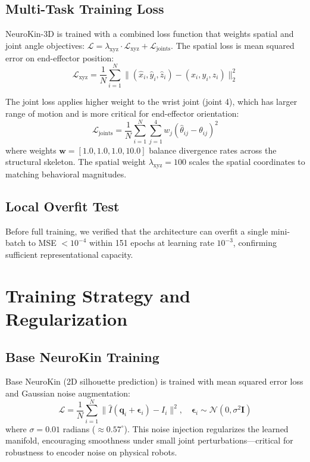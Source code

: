 \documentclass[12pt,a4paper,oneside]{report}
\begin{document}
\subsection{Multi-Task Training Loss}

NeuroKin-3D is trained with a combined loss function that weights spatial and joint angle objectives: $\mathcal{L} = \lambda_{\text{xyz}} \cdot \mathcal{L}_{\text{xyz}} + \mathcal{L}_{\text{joints}}$. The spatial loss is mean squared error on end-effector position:
\begin{equation}
\mathcal{L}_{\text{xyz}} = \frac{1}{N} \sum_{i=1}^{N} \|(\hat{x}_i, \hat{y}_i, \hat{z}_i) - (x_i, y_i, z_i)\|_2^2
\end{equation}

The joint loss applies higher weight to the wrist joint (joint 4), which has larger range of motion and is more critical for end-effector orientation:
\begin{equation}
\mathcal{L}_{\text{joints}} = \frac{1}{N} \sum_{i=1}^{N} \sum_{j=1}^{4} w_j (\hat{\theta}_{ij} - \theta_{ij})^2
\end{equation}
where weights $\mathbf{w} = [1.0, 1.0, 1.0, 10.0]$ balance divergence rates across the structural skeleton. The spatial weight $\lambda_{\text{xyz}} = 100$ scales the spatial coordinates to matching behavioral magnitudes.

\subsection{Local Overfit Test}

Before full training, we verified that the architecture can overfit a single mini-batch to MSE $< 10^{-4}$ within 151 epochs at learning rate $10^{-3}$, confirming sufficient representational capacity.

\section{Training Strategy and Regularization}

\subsection{Base NeuroKin Training}

Base NeuroKin (2D silhouette prediction) is trained with mean squared error loss and Gaussian noise augmentation:
\begin{equation}
\mathcal{L} = \frac{1}{N} \sum_{i=1}^{N} \|\hat{I}(\mathbf{q}_i + \boldsymbol{\epsilon}_i) - I_i\|^2, \quad \boldsymbol{\epsilon}_i \sim \mathcal{N}(0, \sigma^2 \mathbf{I})
\end{equation}
where $\sigma = 0.01$ radians ($\approx 0.57^\circ$). This noise injection regularizes the learned manifold, encouraging smoothness under small joint perturbations---critical for robustness to encoder noise on physical robots.
\end{document}
